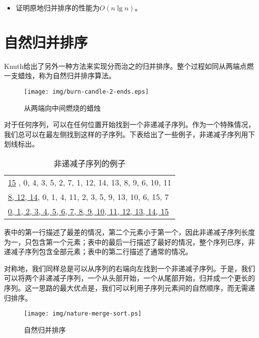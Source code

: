 \documentclass[UTF8]{article}
\begin{document}
\begin{Exercise}
\begin{itemize}
\item 证明原地归并排序的性能为$O(n \lg n)$。
\end{itemize}
\end{Exercise}

\section{自然归并排序}

Knuth给出了另外一种方法来实现分而治之的归并排序。整个过程如同从两端点燃一支蜡烛\cite{TAOCP}，称为自然归并排序算法。

\begin{figure}[htbp]
 \centering
 \texttt{[image: img/burn-candle-2-ends.eps]}
 \caption{从两端向中间燃烧的蜡烛}
 \label{fig:burn-candle}
\end{figure}

对于任何序列，可以在任何位置开始找到一个非递减子序列。作为一个特殊情况，我们总可以在最左侧找到这样的子序列。下表给出了一些例子，非递减子序列用下划线标出。

\begin{table}[htbp]
\centering
\begin{tabular}{ | l |}
\hline
\underline{15} , 0, 4, 3, 5, 2, 7, 1, 12, 14, 13, 8, 9, 6, 10, 11 \\
\underline{8, 12, 14}, 0, 1, 4, 11, 2, 3, 5, 9, 13, 10, 6, 15, 7 \\
\underline{0, 1, 2, 3, 4, 5, 6, 7, 8, 9, 10, 11, 12, 13, 14, 15} \\
\hline
\end{tabular}
\caption{非递减子序列的例子} %
\end{table}

表中的第一行描述了最差的情况，第二个元素小于第一个，因此非递减子序列长度为一，只包含第一个元素；表中的最后一行描述了最好的情况，整个序列已序，非递减子序列包含全部元素；表中的第二行描述了通常的情况。

对称地，我们同样总是可以从序列的右端向左找到一个非递减子序列。于是，我们可以将两个非递减子序列，一个从头部开始，一个从尾部开始，归并成一个更长的序列。这一思路的最大优点是，我们可以利用子序列元素间的自然顺序，而无需递归排序。

\begin{figure}[htbp]
 \centering
 \texttt{[image: img/nature-merge-sort.ps]}
 \caption{自然归并排序}
 \label{fig:nature-merge-sort}
\end{figure}
\end{document}
